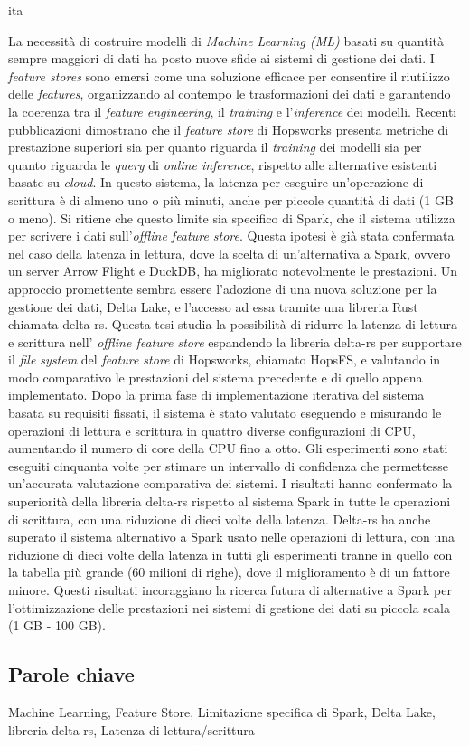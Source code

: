 \markboth{\abstractname}{}
\begin{scontents}[store-env=lang]
ita
\end{scontents}
\begin{scontents}[store-env=abstracts,print-env=true]
La necessità di costruire modelli di \textit{Machine Learning (ML)} basati su quantità sempre maggiori di dati ha posto nuove sfide ai sistemi di gestione dei dati. I \textit{feature stores} sono emersi come una soluzione efficace per consentire il riutilizzo delle \textit{features}, organizzando al contempo le trasformazioni dei dati e garantendo la coerenza tra il \textit{feature engineering}, il \textit{training} e l'\textit{inference} dei modelli. Recenti pubblicazioni dimostrano che il \textit{feature store} di Hopsworks presenta metriche di prestazione superiori sia per quanto riguarda il \textit{training} dei modelli sia per quanto riguarda le \textit{query} di \textit{online inference}, rispetto alle alternative esistenti basate su \textit{cloud}. In questo sistema, la latenza per eseguire un'operazione di scrittura è di almeno uno o più minuti, anche per piccole quantità di dati (1 GB o meno). Si ritiene che questo limite sia specifico di Spark, che il sistema utilizza per scrivere i dati sull'\textit{offline feature store}. Questa ipotesi è già stata confermata nel caso della latenza in lettura, dove la scelta di un'alternativa a Spark, ovvero un server Arrow Flight e DuckDB, ha migliorato notevolmente le prestazioni. Un approccio promettente sembra essere l'adozione di una nuova soluzione per la gestione dei dati, Delta Lake, e l'accesso ad essa tramite una libreria Rust chiamata delta-rs. Questa tesi studia la possibilità di ridurre la latenza di lettura e scrittura nell' \textit{offline feature store}  espandendo la libreria delta-rs per supportare il \textit{file system} del \textit{feature store} di Hopsworks, chiamato HopsFS, e valutando in modo comparativo le prestazioni del sistema precedente e di quello appena implementato. Dopo la prima fase di implementazione iterativa del sistema basata su requisiti fissati, il sistema è stato valutato eseguendo e misurando le operazioni di lettura e scrittura in quattro diverse configurazioni di CPU, aumentando il numero di core della CPU fino a otto. Gli esperimenti sono stati eseguiti cinquanta volte per stimare un intervallo di confidenza che permettesse un'accurata valutazione comparativa dei sistemi. I risultati hanno confermato la superiorità della libreria delta-rs rispetto al sistema Spark in tutte le operazioni di scrittura, con una riduzione di dieci volte della latenza. Delta-rs ha anche superato il sistema alternativo a Spark usato nelle operazioni di lettura, con una riduzione di dieci volte della latenza in tutti gli esperimenti tranne in quello con la tabella più grande (60 milioni di righe), dove il miglioramento è di un fattore minore. Questi risultati incoraggiano la ricerca futura di alternative a Spark per l'ottimizzazione delle prestazioni nei sistemi di gestione dei dati su piccola scala (1 GB - 100 GB).
\end{scontents}
\subsection*{Parole chiave}
\begin{scontents}[store-env=keywords,print-env=true]
Machine Learning, Feature Store, Limitazione specifica di Spark, Delta Lake, libreria delta-rs, Latenza di lettura/scrittura
\end{scontents}